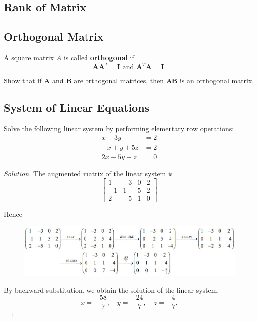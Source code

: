 \subsection{Rank of Matrix}

\subsection{Orthogonal Matrix}
A square matrix $A$ is called \textbf{orthogonal} if
\[ \mathbf{A}\mathbf{A}^T = \mathbf{I} \text{ and } \mathbf{A}^T\mathbf{A} = \mathbf{I}. \]

Show that if $\mathbf{A}$ and $\mathbf{B}$ are orthogonal matrices, then $\mathbf{AB}$ is an orthogonal matrix.

\subsection{System of Linear Equations}
\begin{exmp}{}{}
Solve the following linear system by performing elementary row operations:
\begin{align*}
x - 3y &= 2 \\
-x + y + 5z &= 2 \\
2x - 5y + z &= 0
\end{align*}
\end{exmp}

\begin{proof}[Solution]
The augmented matrix of the linear system is
\[ \begin{bmatrix}
    1 & -3 & 0 & 2 \\
    -1 & 1 & 5 & 2 \\
    2 & -5 & 1 & 0
\end{bmatrix} \]

Hence
\begin{figure}[H]
    \centering
    \includegraphics[width=16cm]{images/aug_matrix.jpg}
\end{figure}

By backward substitution, we obtain the solution of the linear system:
\[ x=-\frac{58}{7}, \quad y=-\frac{24}{7}, \quad z=-\frac{4}{7}. \]
\end{proof}

